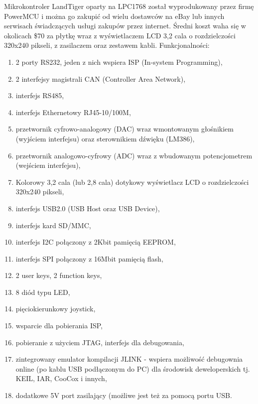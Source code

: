 \documentclass{BscUS}
\begin{document}
Mikrokontroler LandTiger oparty na LPC1768 został wyprodukowany przez firmę PowerMCU i można go zakupić od wielu dostawców na eBay lub innych serwisach świadczących usługi zakupów przez internet. Średni koszt waha się w okolicach \$70 za płytkę wraz z wyświetlaczem LCD 3,2 cala o rozdzielczości 320x240 pikseli, z zasilaczem oraz zestawem kabli. \cite{landtigerDesc}
\newline
Funkcjonalności:
\begin{enumerate} [label=(\alph*)]
\item 2 porty RS232, jeden z nich wspiera ISP (In-system Programming),
\item 2 interfejsy magistrali CAN (Controller Area Network),
\item interfejs RS485,
\item interfejs Ethernetowy RJ45-10/100M,
\item przetwornik cyfrowo-analogowy (DAC) wraz wmontowanym głośnikiem (wyjściem interfejsu) oraz sterownikiem dźwięku (LM386),
\item przetwornik analogowo-cyfrowy (ADC) wraz z wbudowanym potencjometrem (wejściem interfejsu),
\item Kolorowy 3,2 cala (lub 2,8 cala) dotykowy wyświetlacz LCD o rozdzielczości 320x240 pikseli,
\item interfejs USB2.0 (USB Host oraz USB Device),
\item interfejs kard SD/MMC,
\item interfejs I2C połączony z 2Kbit pamięcią EEPROM,
\item interfejs SPI połączony z 16Mbit pamięcią flash,
\item 2 user keys, 2 function keys,
\item 8 diód typu LED,
\item pięciokierunkowy joystick,
\item wsparcie dla pobierania ISP,
\item pobieranie z użyciem JTAG, interfejs dla debugowania,
\item zintegrowany emulator kompilacji JLINK - wspiera możliwość debugownia online (po kablu USB podłączonym do PC) dla środowisk deweloperskich tj. KEIL, IAR, CooCox i innych,
\item dodatkowe 5V port zasilający (możliwe jest też za pomocą portu USB.
\end{enumerate}
\end{document}
